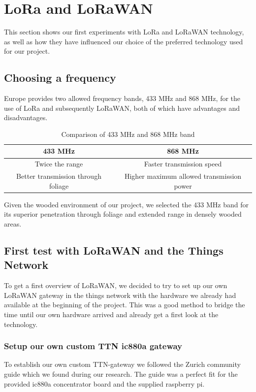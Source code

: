 \section{LoRa and LoRaWAN}
This section shows our first experiments with LoRa and LoRaWAN technology, as well as how they have influenced our choice of the preferred technology used for our project. 

\subsection{Choosing a frequency}
Europe provides two allowed frequency bands, 433 MHz and 868 MHz, for the use of LoRa and subsequently LoRaWAN, both of which have advantages and disadvantages.

\begin{table}[h]
    \centering
    \begin{tabular}{|c|c|}
        \hline
        433 MHz & 868 MHz \\ \hline
        Twice the range & Faster transmission speed \\ \hline
        Better transmission through foliage & Higher maximum allowed transmission power \\ \hline
    \end{tabular}
    \caption{Comparison of 433 MHz and 868 MHz band}
    \label{tab:advantages_disadvantages}
\end{table}
\noindent Given the wooded environment of our project, we selected the 433 MHz band for its superior penetration through foliage and extended range in densely wooded areas.

\subsection{First test with LoRaWAN and the Things Network}
To get a first overview of LoRaWAN, we decided to try to set up our own LoRaWAN gateway in the things network with the hardware we already had available at the beginning of the project. This was a good method to bridge the time until our own hardware arrived and already get a first look at the technology. \hfill 

\subsubsection{Setup our own custom TTN ic880a gateway}
To establish our own custom TTN-gateway we followed the Zurich community guide which we found during our research. The guide was a perfect fit for the provided ic880a concentrator board and the supplied raspberry pi.

